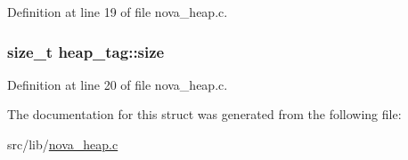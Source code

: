 Definition at line 19 of file nova\-\_\-heap.\-c.

\hypertarget{structheap__tag_aa492677962c3d48df0880c9dacea3564}{
\subsubsection[{size}]{\setlength{\rightskip}{0pt plus 5cm}size\-\_\-t heap\-\_\-tag\-::size}}\label{structheap__tag_aa492677962c3d48df0880c9dacea3564}


Definition at line 20 of file nova\-\_\-heap.\-c.



The documentation for this struct was generated from the following file\-:\begin{DoxyCompactItemize}
\item 
src/lib/\hyperlink{nova__heap_8c}{nova\-\_\-heap.\-c}\end{DoxyCompactItemize}
